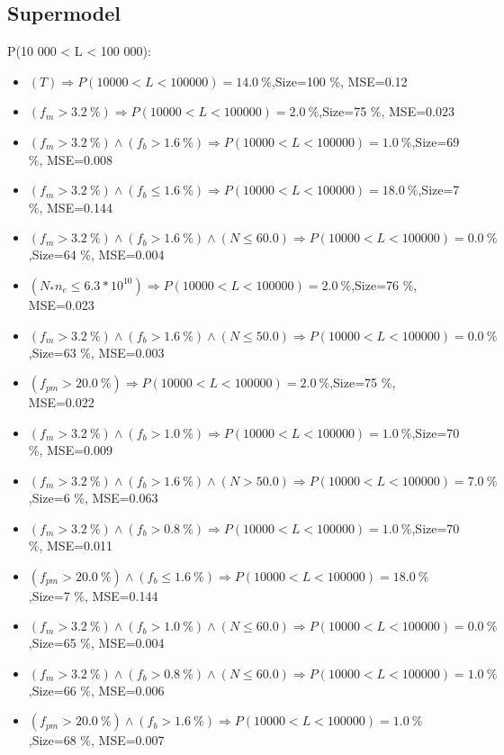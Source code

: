 \documentclass[numbered]{CSL}
\begin{document}
\subsection{Supermodel}
P(10 000 < L < 100 000):
\begin{itemize}
\item $(T) \Rightarrow P(10 000 < L < 100 000) = 14.0~\%$,\hfill Size=100 \%, MSE=0.12
\item $(f_m > 3.2~\%) \Rightarrow P(10 000 < L < 100 000) = 2.0~\%$,\hfill Size=75 \%, MSE=0.023
\item $(f_m > 3.2~\%) \land (f_b > 1.6~\%) \Rightarrow P(10 000 < L < 100 000) = 1.0~\%$,\hfill Size=69 \%, MSE=0.008
\item $(f_m > 3.2~\%) \land (f_b \leq 1.6~\%) \Rightarrow P(10 000 < L < 100 000) = 18.0~\%$,\hfill Size=7 \%, MSE=0.144
\item $(f_m > 3.2~\%) \land (f_b > 1.6~\%) \land (N \leq 60.0) \Rightarrow P(10 000 < L < 100 000) = 0.0~\%$,\hfill Size=64 \%, MSE=0.004
\item $(N_* n_e \leq 6.3 * 10^{10}) \Rightarrow P(10 000 < L < 100 000) = 2.0~\%$,\hfill Size=76 \%, MSE=0.023
\item $(f_m > 3.2~\%) \land (f_b > 1.6~\%) \land (N \leq 50.0) \Rightarrow P(10 000 < L < 100 000) = 0.0~\%$,\hfill Size=63 \%, MSE=0.003
\item $(f_{pm} > 20.0~\%) \Rightarrow P(10 000 < L < 100 000) = 2.0~\%$,\hfill Size=75 \%, MSE=0.022
\item $(f_m > 3.2~\%) \land (f_b > 1.0~\%) \Rightarrow P(10 000 < L < 100 000) = 1.0~\%$,\hfill Size=70 \%, MSE=0.009
\item $(f_m > 3.2~\%) \land (f_b > 1.6~\%) \land (N > 50.0) \Rightarrow P(10 000 < L < 100 000) = 7.0~\%$,\hfill Size=6 \%, MSE=0.063
\item $(f_m > 3.2~\%) \land (f_b > 0.8~\%) \Rightarrow P(10 000 < L < 100 000) = 1.0~\%$,\hfill Size=70 \%, MSE=0.011
\item $(f_{pm} > 20.0~\%) \land (f_b \leq 1.6~\%) \Rightarrow P(10 000 < L < 100 000) = 18.0~\%$,\hfill Size=7 \%, MSE=0.144
\item $(f_m > 3.2~\%) \land (f_b > 1.0~\%) \land (N \leq 60.0) \Rightarrow P(10 000 < L < 100 000) = 0.0~\%$,\hfill Size=65 \%, MSE=0.004
\item $(f_m > 3.2~\%) \land (f_b > 0.8~\%) \land (N \leq 60.0) \Rightarrow P(10 000 < L < 100 000) = 1.0~\%$,\hfill Size=66 \%, MSE=0.006
\item $(f_{pm} > 20.0~\%) \land (f_b > 1.6~\%) \Rightarrow P(10 000 < L < 100 000) = 1.0~\%$,\hfill Size=68 \%, MSE=0.007

\end{itemize}
\end{document}
